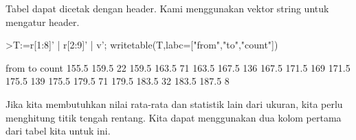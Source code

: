 \documentclass[a4paper,10pt]{article}
\begin{document}
\begin{eulernotebook}
\begin{eulercomment}
\begin{eulercomment}
\begin{eulercomment}
\begin{eulercomment}
\begin{eulercomment}
\begin{eulercomment}
\begin{eulercomment}
\begin{eulercomment}
\begin{eulercomment}
\begin{eulercomment}
\begin{eulercomment}
\begin{eulercomment}
\begin{eulercomment}
\begin{eulercomment}
\begin{eulercomment}
\begin{eulercomment}
\begin{eulercomment}
\begin{eulercomment}
\begin{eulercomment}
Tabel dapat dicetak dengan header. Kami menggunakan vektor string
untuk mengatur header.
\end{eulercomment}
\begin{eulerprompt}
>T:=r[1:8]' | r[2:9]' | v'; writetable(T,labc=["from","to","count"])
\end{eulerprompt}
\begin{euleroutput}
        from        to     count
       155.5     159.5        22
       159.5     163.5        71
       163.5     167.5       136
       167.5     171.5       169
       171.5     175.5       139
       175.5     179.5        71
       179.5     183.5        32
       183.5     187.5         8
\end{euleroutput}
\begin{eulercomment}
Jika kita membutuhkan nilai rata-rata dan statistik lain dari ukuran,
kita perlu menghitung titik tengah rentang. Kita dapat menggunakan dua
kolom pertama dari tabel kita untuk ini.


\end{eulercomment}
\end{eulercomment}
\end{eulercomment}
\end{eulercomment}
\end{eulercomment}
\end{eulercomment}
\end{eulercomment}
\end{eulercomment}
\end{eulercomment}
\end{eulercomment}
\end{eulercomment}
\end{eulercomment}
\end{eulercomment}
\end{eulercomment}
\end{eulercomment}
\end{eulercomment}
\end{eulercomment}
\end{eulercomment}
\end{eulercomment}
\end{eulernotebook}
\end{document}
